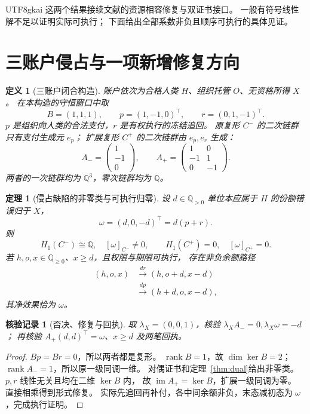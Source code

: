 \documentclass[12pt,a4paper,openany]{report}
\newtheorem{definition}{定义}[chapter]
\newtheorem{theorem}{定理}[chapter]
\newtheorem{Certificate}{核验记录}[chapter]
\newcommand{\QQ}{\mathbb Q}
\newcommand{\im}{\operatorname{im}}
\newcommand{\rank}{\operatorname{rank}}
\begin{document}
\begin{CJK*}{UTF8}{gkai}
这两个结果接续文献\cite{ERepair}的资源相容修复与双证书接口。
一般有符号线性解不足以证明实际可执行；
下面给出全部系数非负且顺序可执行的具体见证。

\section{三账户侵占与一项新增修复方向}
\begin{definition}[三账户闭合构造]
\label{def:three-ledger}
账户依次为合格人类 \(H\)、组织托管 \(O\)、无资格所得 \(X\)。
在本构造的守恒窗口中取
\[
B=(1,1,1),\qquad
p=(1,-1,0)^\top,\qquad r=(0,1,-1)^\top.
\]
\(p\) 是组织向人类的合法支付，\(r\) 是有权执行的冻结追回。
原复形 \(C^-\) 的二次链群只有支付生成元 \(e_p\)；
扩展复形 \(C^+\) 的二次链群由 \(e_p,e_r\) 生成：
\[
A_-=\begin{pmatrix}1\\-1\\0\end{pmatrix},
\qquad
A_+=\begin{pmatrix}1&0\\-1&1\\0&-1\end{pmatrix}.
\]
两者的一次链群均为 \(\QQ^3\)，零次链群均为 \(\QQ\)。
\end{definition}

\begin{theorem}[侵占缺陷的非零类与可执行归零]
\label{thm:repair-example}
设 \(d\in\QQ_{>0}\) 单位本应属于 \(H\) 的份额错误归于 \(X\)，
\[
\omega=(d,0,-d)^\top=d(p+r).
\]
则
\[
H_1(C^-)\cong\QQ,\quad [\omega]_{C^-}\ne0,\qquad
H_1(C^+)=0,\quad[\omega]_{C^+}=0.
\]
若 \(h,o,x\in\QQ_{\ge0}\)、\(x\ge d\)，且权限与期限可执行，
存在非负余额路径
\[
\begin{aligned}
(h,o,x)&\xrightarrow{dr}(h,o+d,x-d)\\
&\xrightarrow{dp}(h+d,o,x-d),
\end{aligned}
\]
其净效果恰为 \(\omega\)。
\end{theorem}
\begin{Certificate}[否决、修复与回执]
取 \(\lambda_X=(0,0,1)\)，核验
\(\lambda_XA_-=0,\lambda_X\omega=-d\)；
再核验 \(A_+(d,d)^\top=\omega\)、\(x\ge d\) 及两笔回执。
\end{Certificate}
\begin{proof}
\(Bp=Br=0\)，所以两者都是复形。
\(\rank B=1\)，故 \(\dim\ker B=2\)；
\(\rank A_-=1\)，所以原一级同调一维。
对偶证书和定理~\ref{thm:dual}给出非零类。
\(p,r\) 线性无关且均在二维 \(\ker B\) 内，
故 \(\im A_+=\ker B\)，扩展一级同调为零。
直接相乘得到形式修复。
实际先追回再补付，各中间余额非负，末态减初态为 \(\omega\)，完成执行证明。
\end{proof}


\end{CJK*}
\end{document}
